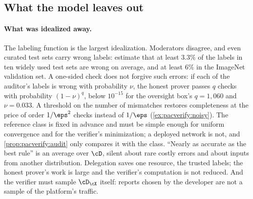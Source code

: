 \begin{refsection}
\section{What the model leaves out}\label{sec:pacverify:leaves}

\paragraph{What was idealized away.} The labeling function is the largest idealization. Moderators disagree, and even curated test sets carry wrong labels: \textcite{NorthcuttAthalyeMueller2021} estimate that at least $3.3\%$ of the labels in ten widely used test sets are wrong on average, and at least $6\%$ in the ImageNet validation set. A one-sided check does not forgive such errors: if each of the auditor's labels is wrong with probability $\nu$, the honest prover passes $q$ checks with probability $(1-\nu)^q$, below $10^{-15}$ for the oversight box's $q=1{,}060$ and $\nu=0.033$. A threshold on the number of mismatches restores completeness at the price of order $1/\eps^2$ checks instead of $1/\eps$ (\cref{ex:pacverify:noisy}). The reference class is fixed in advance and must be simple enough for uniform convergence and for the verifier's minimization; a deployed network is not, and \cref{prop:pacverify:audit} only compares it with the class. ``Nearly as accurate as the best rule'' is an average over $\cD$, silent about rare costly errors and about inputs from another distribution. Delegation saves one resource, the trusted labels; the honest prover's work is large and the verifier's computation is not reduced. And the verifier must sample $\cD_\cX$ itself: reports chosen by the developer are not a sample of the platform's traffic.


\end{refsection}
